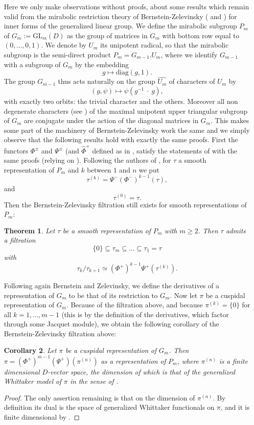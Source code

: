 \documentclass[11pt,letterpaper]{amsart}
\newcommand{\GL}{{\mathrm {GL}}} \newcommand{\PGL}{{\mathrm {PGL}}}
\def\diag{\mathrm{diag}}
\theoremstyle{plain}
\newtheorem{thm}{Theorem}[section] \newtheorem{cor}[thm]{Corollary}
\numberwithin{equation}{section}
\begin{document}
Here we only make observations without proofs, about some results which remain valid from the mirabolic restriction theory of Bernstein-Zelevinsky (\cite{BZ1} and \cite{BZ2}) for inner forms of the generalized linear group. We define the mirabolic subgroup $P_m$ of $G_m:=\GL_m(D)$ as the group of matrices in $G_m$ with bottom row equal to $(0,\dots,0,1)$. We denote by $U_m$ its unipotent radical, so that the mirabolic subgroup is the semi-direct product $P_m=G_{m-1}.U_m$, where we identify $G_{m-1}$ with a subgroup of $G_m$ by the embedding 
\[g\mapsto \diag(g,1).\] The group $G_{m-1}$ thus acts naturally on the group $\widehat{U_m}$ of characters of $U_m$ by 
\[(g,\psi)\mapsto \psi(g^{-1}\ \cdot \ g),\] with exactly two orbits: the trivial character and the others. Moreover all non degenerate characters (see \cite{BH}) of the maximal unipotent upper triangular subgroup of $G_m$ are conjugate under the action of the diagonal matrices in $G_m$. This makes some part of the machinery of Bernstein-Zelevinsky work the same and we simply observe that the following results hold with exactly the same proofs. First the functors $\Phi^\pm$ and $\Psi^\pm$ (and $\hat{\Phi}^+$ defined as in \cite[Section 3]{BZ2}, satisfy the statements of \cite[Propositions 3.2 and 3.4]{BZ2} with the same proofs (relying on \cite[Section 5.11]{BZ1}). Following the authors of 
\cite{BZ2}, for 
$\tau$ a smooth representation of $P_m$ and $k$ between $1$ and $n$ we put \[\tau^{(k)}=\Psi^-(\Phi^-)^{k-1}(\tau),\] and 
 \[\tau^{(0)}=\tau.\]
Then the Bernstein-Zelevinsky filtration still exists for smooth representations of $P_m$:

\begin{thm}{\cite[Corollary 3.4]{BZ2}}
Let $\tau$ be a smooth representation of $P_m$ with $m\geq 2$. Then $\tau$ admits a filtration \[\{0\}\subseteq \tau_m \subseteq \dots \subseteq \tau_1=\tau \] 
with \[\tau_k/\tau_{k+1}\simeq (\Phi^+)^{k-1}\Psi^+(\tau^{(k)}).\]

\end{thm}

Following again Bernstein and Zelevinsky, we define the derivatives of a representation of $G_m$ to be that of its restriction to $G_m$. Now let $\pi$ be a cuspidal representation of $G_m$. Because of the filtration above, and because $\pi^{(k)}=\{0\}$ for all $k=1,\dots,m-1$ (this is by the definition of the derivatives, which factor through some Jacquet module), we obtain the following corollary of the Bernstein-Zelevinsky filtration above:

\begin{cor}
Let $\pi$ be a cuspidal representation of $G_m$. Then $\pi=(\Phi^{+})^{m-1}(\Psi^+)(\pi^{(n)})$ as a representation of $P_m$, where $\pi^{(n)}$ is a finite dimensional $D$-vector space, the dimension of which is that of the generalized Whittaker model of $\pi$ in the sense of \cite{BH}.
\end{cor}
\begin{proof}
The only assertion remaining is that on the dimension of $\pi^{(n)}$. By definition its dual is the space of generalized Whittaker functionals on $\pi$, and it is finite dimensional by \cite{MW}.
\end{proof}
\end{document}

